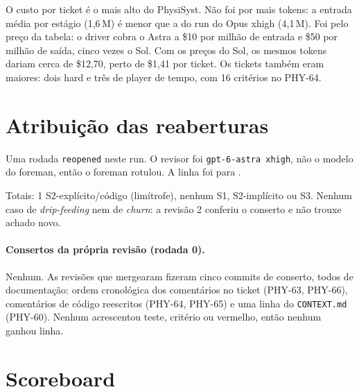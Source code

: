 \documentclass[11pt,a4paper]{article}
\begin{document}
\medskip
O custo por ticket é o mais alto do PhysiSyst. Não foi por mais tokens:
a entrada média por estágio (1,6\,M) é menor que a do run do Opus xhigh (4,1\,M).
Foi pelo preço da tabela: o driver cobra o Astra a \$10 por milhão de entrada
e \$50 por milhão de saída, cinco vezes o Sol. Com os preços do Sol, os mesmos
tokens dariam cerca de \$12,70, perto de \$1,41 por ticket. Os tickets também eram
maiores: dois hard e três de player de tempo, com 16 critérios no PHY-64.

\section{Atribuição das reaberturas}

Uma rodada \texttt{reopened} neste run. O revisor foi \texttt{gpt-6-astra
xhigh}, não o modelo do foreman, então o foreman rotulou. A linha foi para
.

\medskip
{}

\medskip
Totais: 1 S2-explícito/código (limítrofe), nenhum S1, S2-implícito ou S3.
Nenhum caso de \emph{drip-feeding} nem de \emph{churn}: a revisão 2 conferiu o
conserto e não trouxe achado novo.

\paragraph{Consertos da própria revisão (rodada 0).} Nenhum. As revisões que
mergearam fizeram cinco commits de conserto, todos de documentação: ordem
cronológica dos comentários no ticket (PHY-63, PHY-66), comentários de código
reescritos (PHY-64, PHY-65) e uma linha do \texttt{CONTEXT.md} (PHY-60). Nenhum
acrescentou teste, critério ou vermelho, então nenhum ganhou linha.

\section{Scoreboard}
\end{document}
